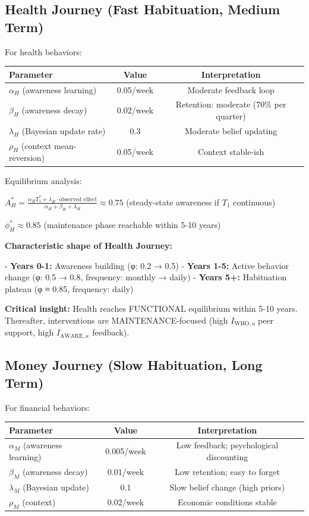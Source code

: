 \subsection{Health Journey (Fast Habituation, Medium Term)}

For health behaviors:

\begin{center}
\begin{tabular}{@{}lcc@{}}
\toprule
\textbf{Parameter} & \textbf{Value} & \textbf{Interpretation} \\
\midrule
$\alpha_H$ (awareness learning) & 0.05/week & Moderate feedback loop \\
$\beta_H$ (awareness decay) & 0.02/week & Retention: moderate (70\% per quarter) \\
$\lambda_H$ (Bayesian update rate) & 0.3 & Moderate belief updating \\
$\rho_H$ (context mean-reversion) & 0.05/week & Context stable-ish \\
\midrule
\end{tabular}
\end{center}

Equilibrium analysis:

$A^*_H = \frac{\alpha_H T_1^* + \lambda_H \cdot \text{observed effect}}{\alpha_H + \beta_H + \lambda_H} \approx 0.75$ (steady-state awareness if $T_1$ continuous)

$\phi^*_H \approx 0.85$ (maintenance phase reachable within 5-10 years)

\textbf{Characteristic shape of Health Journey:}

- \textbf{Years 0-1:} Awareness building (φ: 0.2 → 0.5)
- \textbf{Years 1-5:} Active behavior change (φ: 0.5 → 0.8, frequency: monthly → daily)
- \textbf{Years 5+:} Habituation plateau (φ ≈ 0.85, frequency: daily)

\textbf{Critical insight:} Health reaches FUNCTIONAL equilibrium within 5-10 years. Thereafter, interventions are MAINTENANCE-focused (high $I_{\text{WHO},o}$ peer support, high $I_{\text{AWARE},\kappa}$ feedback).

\subsection{Money Journey (Slow Habituation, Long Term)}

For financial behaviors:

\begin{center}
\begin{tabular}{@{}lcc@{}}
\toprule
\textbf{Parameter} & \textbf{Value} & \textbf{Interpretation} \\
\midrule
$\alpha_M$ (awareness learning) & 0.005/week & Low feedback; psychological discounting \\
$\beta_M$ (awareness decay) & 0.01/week & Low retention; easy to forget \\
$\lambda_M$ (Bayesian update) & 0.1 & Slow belief change (high priors) \\
$\rho_M$ (context) & 0.02/week & Economic conditions stable \\
\midrule
\end{tabular}
\end{center}

